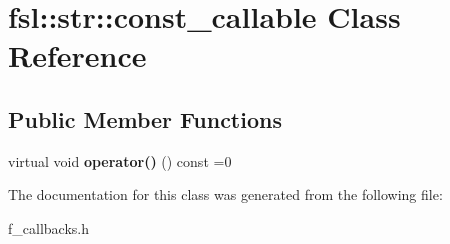 \hypertarget{classfsl_1_1str_1_1const__callable}{}\section{fsl\+::str\+::const\+\_\+callable Class Reference}
\label{classfsl_1_1str_1_1const__callable}
\subsection*{Public Member Functions}
\begin{DoxyCompactItemize}
\item 
\mbox{\label{classfsl_1_1str_1_1const__callable_a51d4282577a48f716ce87e5a1efbac8f}} 
virtual void {\bfseries operator()} () const =0
\end{DoxyCompactItemize}


The documentation for this class was generated from the following file\+:\begin{DoxyCompactItemize}
\item 
f\+\_\+callbacks.\+h\end{DoxyCompactItemize}
